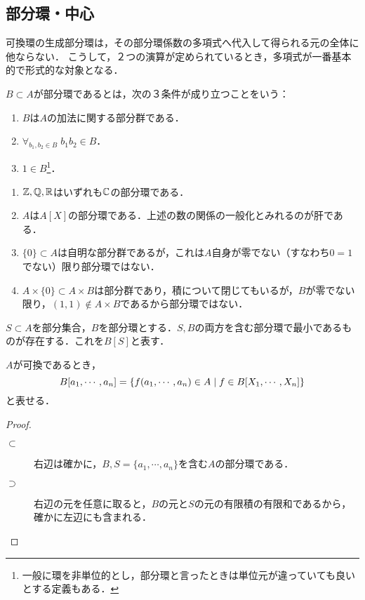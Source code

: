\documentclass[uplatex,dvipdfmx]{jsreport}
\begin{document}
\subsection{部分環・中心}

\begin{tcolorbox}[colframe=ForestGreen, colback=ForestGreen!10!white,breakable,colbacktitle=ForestGreen!40!white,coltitle=black,fonttitle=\bfseries\sffamily,
title=]
    可換環の生成部分環は，その部分環係数の多項式へ代入して得られる元の全体に他ならない．
    こうして，２つの演算が定められているとき，多項式が一番基本的で形式的な対象となる．
\end{tcolorbox}

\begin{definition}[subring]
    $B\subset A$が部分環であるとは，次の３条件が成り立つことをいう：
    \begin{enumerate}
        \item $B$は$A$の加法に関する部分群である．
        \item $\forall_{b_1,b_2\in B}\;b_1b_2\in B$．
        \item $1\in B$\footnote{一般に環を非単位的とし，部分環と言ったときは単位元が違っていても良いとする定義もある．}．
    \end{enumerate}
\end{definition}

\begin{example}\mbox{}
    \begin{enumerate}
        \item $\mathbb{Z},\mathbb{Q},\mathbb{R}$はいずれも$\mathbb{C}$の部分環である．
        \item $A$は$A[X]$の部分環である．上述の数の関係の一般化とみれるのが肝である．
        \item $\{0\}\subset A$は自明な部分群であるが，これは$A$自身が零でない（すなわち$0=1$でない）限り部分環ではない．
        \item $A\times\{0\}\subset A\times B$は部分群であり，積について閉じてもいるが，$B$が零でない限り，$(1,1)\notin A\times B$であるから部分環ではない．
    \end{enumerate}
\end{example}

\begin{definition}
    $S\subset A$を部分集合，$B$を部分環とする．$S,B$の両方を含む部分環で最小であるものが存在する．これを$B[S]$と表す．
\end{definition}

\begin{lemma}[可換環の生成部分環は自由環を潰して作れる]
    $A$が可換であるとき，
    \[B[a_1,\cdots,a_n]=\left\{f(a_1,\cdots,a_n)\in A\mid f\in B[X_1,\cdots,X_n]\right\}\]
    と表せる．
\end{lemma}
\begin{proof}\mbox{}
    \begin{description}
        \item[$\subset$] 右辺は確かに，$B,S=\{a_1,\cdots,a_n\}$を含む$A$の部分環である．
        \item[$\supset$] 右辺の元を任意に取ると，$B$の元と$S$の元の有限積の有限和であるから，確かに左辺にも含まれる．
    \end{description}
\end{proof}
\end{document}
